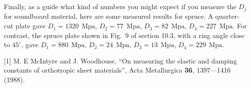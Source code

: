   Finally, as a guide what kind of numbers you might expect if you measure the 
  $D_j$ for soundboard material, here are some measured results for spruce. A 
  quarter-cut plate gave $D_1=1320~\mathrm{~Mpa}$, $D_2=77~\mathrm{~Mpa}$, 
  $D_3=82~\mathrm{~Mpa}$, $D_4=227~\mathrm{~Mpa}$. For contrast, the spruce 
  plate shown in Fig.\ 9 of section 10.3, with a ring angle close to 
  $45^\circ$, gave $D_1=880~\mathrm{~Mpa}$, $D_2=24~\mathrm{~Mpa}$, 
  $D_3=13~\mathrm{~Mpa}$, $D_4=229~\mathrm{~Mpa}$. 

  \sectionreferences{}[1] M. E McIntyre and J. Woodhouse, “On measuring the 
  elastic and damping constants of orthotropic sheet materials”, Acta 
  Metallurgica \textbf{36}, 1397—1416 (1988). 